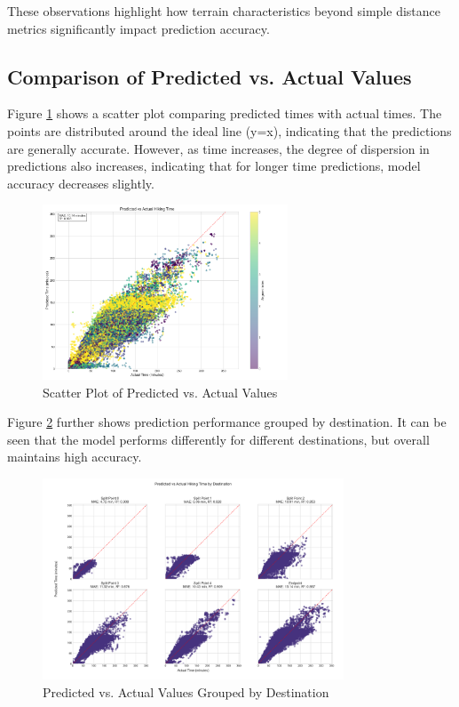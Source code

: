 \documentclass[12pt]{article}
\begin{document}
These observations highlight how terrain characteristics beyond simple distance metrics significantly impact prediction accuracy.

\subsection{Comparison of Predicted vs. Actual Values}

Figure \ref{fig:pred_vs_actual} shows a scatter plot comparing predicted times with actual times. The points are distributed around the ideal line (y=x), indicating that the predictions are generally accurate. However, as time increases, the degree of dispersion in predictions also increases, indicating that for longer time predictions, model accuracy decreases slightly.

\begin{figure}[H]
\centering
\includegraphics[width=0.65\textwidth]{visualization_results/prediction_vs_actual.png}
\caption{Scatter Plot of Predicted vs. Actual Values}
\label{fig:pred_vs_actual}
\end{figure}

Figure \ref{fig:pred_by_dest} further shows prediction performance grouped by destination. It can be seen that the model performs differently for different destinations, but overall maintains high accuracy.

\begin{figure}[H]
\centering
\includegraphics[width=0.8\textwidth]{visualization_results/prediction_vs_actual_by_destination.png}
\caption{Predicted vs. Actual Values Grouped by Destination}
\label{fig:pred_by_dest}
\end{figure}
\end{document}
